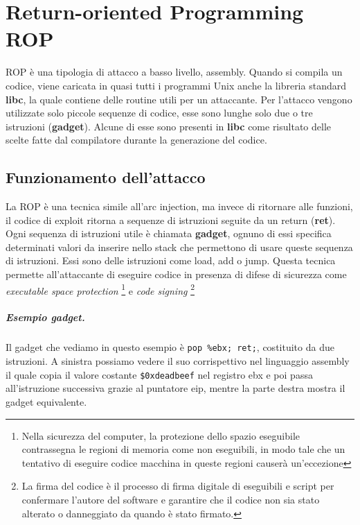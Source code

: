\chapter{Return-oriented Programming ROP}

ROP è una tipologia di attacco a basso livello, assembly.
Quando si compila un codice, viene caricata in quasi tutti i programmi Unix anche la
libreria standard \textbf{libc}, la quale contiene delle routine utili per un attaccante.
Per l'attacco vengono utilizzate solo piccole sequenze di codice, esse sono lunghe
solo due o tre istruzioni (\textbf{gadget}). Alcune di esse sono presenti in \textbf{libc}
come risultato delle scelte fatte dal compilatore durante la generazione del codice.

\section{Funzionamento dell'attacco}

La ROP è una tecnica simile all'arc injection, ma invece di ritornare alle funzioni,
il codice di exploit ritorna a sequenze di istruzioni seguite da un return (\textbf{ret}).
Ogni sequenza di istruzioni utile è chiamata \textbf{gadget},
ognuno di essi specifica determinati valori da inserire nello stack che permettono
di usare queste sequenza di istruzioni.
Essi sono delle istruzioni come load, add o jump. Questa tecnica permette all'attaccante
di eseguire codice in presenza di difese di sicurezza
come \textit{executable space protection}
\footnote{ Nella sicurezza del computer, la protezione dello spazio eseguibile contrassegna
    le regioni di memoria come non eseguibili,
    in modo tale che un tentativo di eseguire codice macchina in queste regioni causerà un'eccezione}
e \textit{code signing}
\footnote{La firma del codice è il processo di firma digitale di eseguibili e script
    per confermare l'autore del software e garantire che
    il codice non sia stato alterato o danneggiato da quando è stato firmato.}

\paragraph{Esempio gadget.} Il gadget che vediamo in questo esempio
è \verb|pop %ebx; ret;|, costituito da due istruzioni. A sinistra possiamo vedere
il suo corrispettivo nel linguaggio assembly il quale copia il valore
costante \verb|$0xdeadbeef| nel registro ebx e poi passa all'istruzione successiva
grazie al puntatore eip, mentre la parte destra mostra il gadget equivalente.

